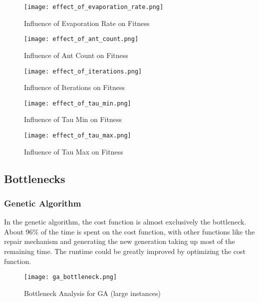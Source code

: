 \documentclass{article}
\begin{document}
\begin{figure}[H]
    \centering
    \texttt{[image: effect\_of\_evaporation\_rate.png]}
    \caption{Influence of Evaporation Rate on Fitness}
    \label{fig:evaporation_rate}
\end{figure}

\begin{figure}[H]
    \centering
    \texttt{[image: effect\_of\_ant\_count.png]}
    \caption{Influence of Ant Count on Fitness}
    \label{fig:ant_count}
\end{figure}

\begin{figure}[H]
    \centering
    \texttt{[image: effect\_of\_iterations.png]}
    \caption{Influence of Iterations on Fitness}
    \label{fig:iterations}
\end{figure}

\begin{figure}[H]
    \centering
    \texttt{[image: effect\_of\_tau\_min.png]}
    \caption{Influence of Tau Min on Fitness}
    \label{fig:tau_min}
\end{figure}

\begin{figure}[H]
    \centering
    \texttt{[image: effect\_of\_tau\_max.png]}
    \caption{Influence of Tau Max on Fitness}
    \label{fig:tau_max}
\end{figure}

\subsection{Bottlenecks}

\subsubsection{Genetic Algorithm}
In the genetic algorithm, the cost function is almost exclusively the bottleneck. About 96\% of the time is spent on the cost function, with other functions like the repair mechanism and generating
the new generation taking up most of the remaining time. The runtime could be greatly improved by optimizing the cost function.

\begin{figure}[H]
    \centering
    \texttt{[image: ga\_bottleneck.png]}
    \caption{Bottleneck Analysis for GA (large instances)}
    \label{fig:ga_bottleneck}
\end{figure}
\end{document}
